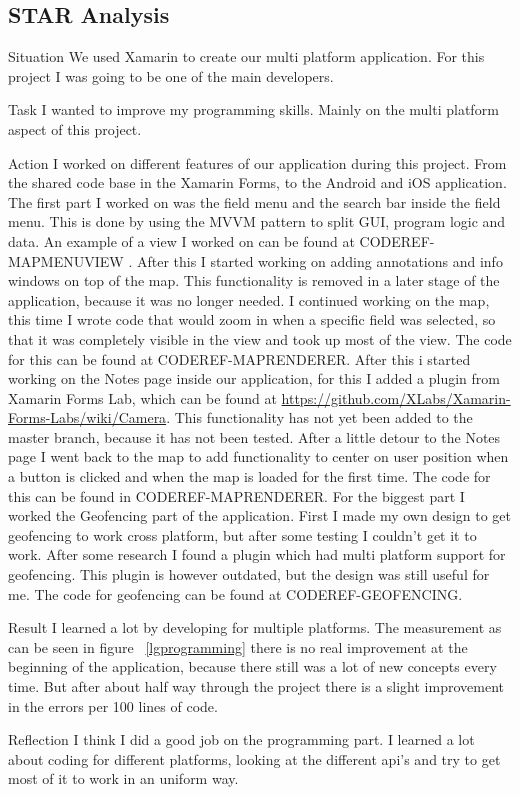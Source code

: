 \documentclass[12pt]{article}
\begin{document}
	\subsection{STAR Analysis}
	\begin{STAR}
	    \item[Situation] We used Xamarin to create our multi platform application. For this project I was going to be one of the main developers. 
	    \item[Task] I wanted to improve my programming skills. Mainly on the multi platform aspect of this project. 
	    \item[Action] I worked on different features of our application during this project. From the shared code base in the Xamarin Forms, to the Android and iOS application. The first part I worked on was the field menu and the search bar inside the field menu. This is done by using the MVVM pattern to split GUI, program logic and data. An example of a view I worked on can be found at CODEREF-MAPMENUVIEW . After this I started working on adding annotations and info windows on top of the map. This functionality is removed in a later stage of the application, because it was no longer needed. I continued working on the map, this time I wrote code that would zoom in when a specific field was selected, so that it was completely visible in the view and took up most of the view. The code for this can be found at CODEREF-MAPRENDERER. After this i started working on the Notes page inside our application, for this I added a plugin from Xamarin Forms Lab, which can be found at \url{https://github.com/XLabs/Xamarin-Forms-Labs/wiki/Camera}. This functionality has not yet been added to the master branch, because it has not been tested. After a little detour to the Notes page I went back to the map to add functionality to center on user position when a button is clicked and when the map is loaded for the first time. The code for this can be found in CODEREF-MAPRENDERER. For the biggest part I worked the Geofencing part of the application. First I made my own design to get geofencing to work cross platform, but after some testing I couldn't get it to work. After some research I found a plugin which had multi platform support for geofencing. This plugin is however outdated, but the design was still useful for me. The code for geofencing can be found at CODEREF-GEOFENCING.
	    \item[Result] I learned a lot by developing for multiple platforms. The measurement as can be seen in figure ~\ref{lgprogramming} there is no real improvement at the beginning of the application, because there still was a lot of new concepts every time. But after about half way through the project there is a slight improvement in the errors per 100 lines of code.
	    \item[Reflection] I think I did a good job on the programming part. I learned a lot about coding for different platforms, looking at the different api's and try to get most of it to work in an uniform way.
	\end{STAR}
	
\end{document}
